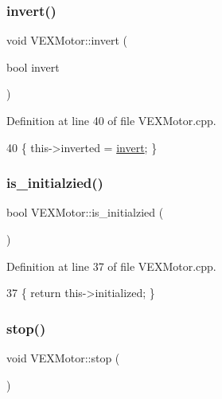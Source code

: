 \subsubsection{\texorpdfstring{invert()}{invert()}}
{\footnotesize\ttfamily void V\+E\+X\+Motor\+::invert (\begin{DoxyParamCaption}\item[{bool}]{invert }\end{DoxyParamCaption})}



Definition at line 40 of file V\+E\+X\+Motor.\+cpp.


\begin{DoxyCode}
40 \{ this->inverted = \hyperlink{class_v_e_x_motor_a2c4c51b0b9c1c6747e0a8f1cee9f39e3}{invert}; \}
\end{DoxyCode}
\mbox{\label{class_v_e_x_motor_a426abe40a80c506b6f7297c070f109e2}} 
\subsubsection{\texorpdfstring{is\+\_\+initialzied()}{is\_initialzied()}}
{\footnotesize\ttfamily bool V\+E\+X\+Motor\+::is\+\_\+initialzied (\begin{DoxyParamCaption}{ }\end{DoxyParamCaption})}



Definition at line 37 of file V\+E\+X\+Motor.\+cpp.


\begin{DoxyCode}
37 \{ \textcolor{keywordflow}{return} this->initialized; \}
\end{DoxyCode}
\mbox{\label{class_v_e_x_motor_abb2dd7163f613f47b4c9e000b8214d6b}} 
\subsubsection{\texorpdfstring{stop()}{stop()}}
{\footnotesize\ttfamily void V\+E\+X\+Motor\+::stop (\begin{DoxyParamCaption}{ }\end{DoxyParamCaption})}



